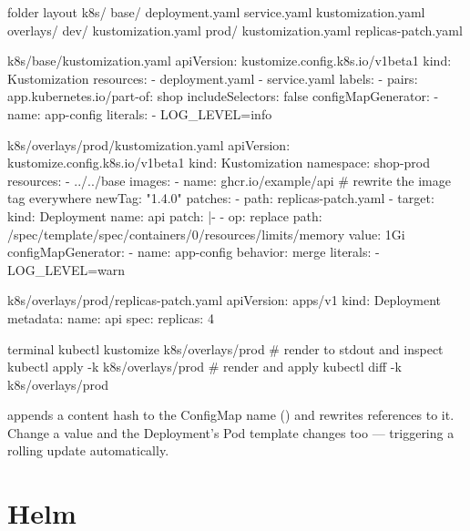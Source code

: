 \begin{plaincode}{folder layout}
k8s/
  base/
    deployment.yaml
    service.yaml
    kustomization.yaml
  overlays/
    dev/
      kustomization.yaml
    prod/
      kustomization.yaml
      replicas-patch.yaml
\end{plaincode}

\begin{yamlcode}{k8s/base/kustomization.yaml}
apiVersion: kustomize.config.k8s.io/v1beta1
kind: Kustomization
resources:
  - deployment.yaml
  - service.yaml
labels:
  - pairs:
      app.kubernetes.io/part-of: shop
    includeSelectors: false
configMapGenerator:
  - name: app-config
    literals:
      - LOG_LEVEL=info
\end{yamlcode}

\begin{yamlcode}{k8s/overlays/prod/kustomization.yaml}
apiVersion: kustomize.config.k8s.io/v1beta1
kind: Kustomization
namespace: shop-prod
resources:
  - ../../base
images:
  - name: ghcr.io/example/api          # rewrite the image tag everywhere
    newTag: "1.4.0"
patches:
  - path: replicas-patch.yaml
  - target:
      kind: Deployment
      name: api
    patch: |-
      - op: replace
        path: /spec/template/spec/containers/0/resources/limits/memory
        value: 1Gi
configMapGenerator:
  - name: app-config
    behavior: merge
    literals:
      - LOG_LEVEL=warn
\end{yamlcode}

\begin{yamlcode}{k8s/overlays/prod/replicas-patch.yaml}
apiVersion: apps/v1
kind: Deployment
metadata:
  name: api
spec:
  replicas: 4
\end{yamlcode}

\begin{bashcode}{terminal}
kubectl kustomize k8s/overlays/prod      # render to stdout and inspect
kubectl apply -k k8s/overlays/prod       # render and apply
kubectl diff  -k k8s/overlays/prod
\end{bashcode}

\begin{keyidea}
 appends a content hash to the ConfigMap name
() and rewrites references to it. Change a value and the
Deployment's Pod template changes too --- triggering a rolling update
automatically.
\end{keyidea}

\section{Helm}

